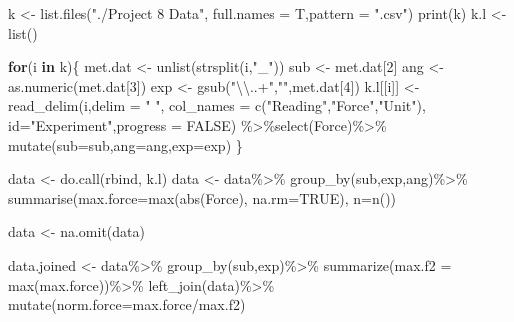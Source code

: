 \documentclass[
]{article}
\newenvironment{Shaded}{\begin{snugshade}}{\end{snugshade}}
\newcommand{\AttributeTok}[1]{\textcolor[rgb]{0.77,0.63,0.00}{#1}}
\newcommand{\ConstantTok}[1]{\textcolor[rgb]{0.00,0.00,0.00}{#1}}
\newcommand{\ControlFlowTok}[1]{\textcolor[rgb]{0.13,0.29,0.53}{\textbf{#1}}}
\newcommand{\DecValTok}[1]{\textcolor[rgb]{0.00,0.00,0.81}{#1}}
\newcommand{\FunctionTok}[1]{\textcolor[rgb]{0.00,0.00,0.00}{#1}}
\newcommand{\NormalTok}[1]{#1}
\newcommand{\OtherTok}[1]{\textcolor[rgb]{0.56,0.35,0.01}{#1}}
\newcommand{\SpecialCharTok}[1]{\textcolor[rgb]{0.00,0.00,0.00}{#1}}
\newcommand{\StringTok}[1]{\textcolor[rgb]{0.31,0.60,0.02}{#1}}
\begin{document}
\begin{Shaded}
\begin{Highlighting}[]
\NormalTok{k }\OtherTok{\textless{}{-}} \FunctionTok{list.files}\NormalTok{(}\StringTok{"./Project 8 Data"}\NormalTok{, }\AttributeTok{full.names =}\NormalTok{ T,}\AttributeTok{pattern =} \StringTok{".csv"}\NormalTok{)}
\FunctionTok{print}\NormalTok{(k)}
\NormalTok{k.l }\OtherTok{\textless{}{-}} \FunctionTok{list}\NormalTok{()}

\ControlFlowTok{for}\NormalTok{(i }\ControlFlowTok{in}\NormalTok{ k)\{}
\NormalTok{  met.dat }\OtherTok{\textless{}{-}} \FunctionTok{unlist}\NormalTok{(}\FunctionTok{strsplit}\NormalTok{(i,}\StringTok{"\_"}\NormalTok{))}
\NormalTok{  sub }\OtherTok{\textless{}{-}}\NormalTok{ met.dat[}\DecValTok{2}\NormalTok{]}
\NormalTok{  ang }\OtherTok{\textless{}{-}} \FunctionTok{as.numeric}\NormalTok{(met.dat[}\DecValTok{3}\NormalTok{])}
\NormalTok{  exp }\OtherTok{\textless{}{-}} \FunctionTok{gsub}\NormalTok{(}\StringTok{"}\SpecialCharTok{\textbackslash{}\textbackslash{}}\StringTok{..+"}\NormalTok{,}\StringTok{""}\NormalTok{,met.dat[}\DecValTok{4}\NormalTok{])}
\NormalTok{  k.l[[i]] }\OtherTok{\textless{}{-}} \FunctionTok{read\_delim}\NormalTok{(i,}\AttributeTok{delim =} \StringTok{" "}\NormalTok{, }\AttributeTok{col\_names =} \FunctionTok{c}\NormalTok{(}\StringTok{"Reading"}\NormalTok{,}\StringTok{"Force"}\NormalTok{,}\StringTok{"Unit"}\NormalTok{), }\AttributeTok{id=}\StringTok{"Experiment"}\NormalTok{,}\AttributeTok{progress =} \ConstantTok{FALSE}\NormalTok{) }\SpecialCharTok{\%\textgreater{}\%}\FunctionTok{select}\NormalTok{(Force)}\SpecialCharTok{\%\textgreater{}\%}
    \FunctionTok{mutate}\NormalTok{(}\AttributeTok{sub=}\NormalTok{sub,}\AttributeTok{ang=}\NormalTok{ang,}\AttributeTok{exp=}\NormalTok{exp)}
\NormalTok{\}}

\NormalTok{data }\OtherTok{\textless{}{-}} \FunctionTok{do.call}\NormalTok{(rbind, k.l)}
\NormalTok{data }\OtherTok{\textless{}{-}}\NormalTok{ data}\SpecialCharTok{\%\textgreater{}\%}
  \FunctionTok{group\_by}\NormalTok{(sub,exp,ang)}\SpecialCharTok{\%\textgreater{}\%}
  \FunctionTok{summarise}\NormalTok{(}\AttributeTok{max.force=}\FunctionTok{max}\NormalTok{(}\FunctionTok{abs}\NormalTok{(Force), }\AttributeTok{na.rm=}\ConstantTok{TRUE}\NormalTok{), }\AttributeTok{n=}\FunctionTok{n}\NormalTok{())}

\NormalTok{data }\OtherTok{\textless{}{-}} \FunctionTok{na.omit}\NormalTok{(data)}

\NormalTok{data.joined }\OtherTok{\textless{}{-}}\NormalTok{ data}\SpecialCharTok{\%\textgreater{}\%}
  \FunctionTok{group\_by}\NormalTok{(sub,exp)}\SpecialCharTok{\%\textgreater{}\%}
  \FunctionTok{summarize}\NormalTok{(}\AttributeTok{max.f2 =} \FunctionTok{max}\NormalTok{(max.force))}\SpecialCharTok{\%\textgreater{}\%}
  \FunctionTok{left\_join}\NormalTok{(data)}\SpecialCharTok{\%\textgreater{}\%}
  \FunctionTok{mutate}\NormalTok{(}\AttributeTok{norm.force=}\NormalTok{max.force}\SpecialCharTok{/}\NormalTok{max.f2)}


\end{Highlighting}
\end{Shaded}
\end{document}
